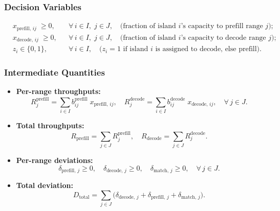 \subsubsection*{Decision Variables}
\[
\begin{aligned}
& x_{\mathrm{prefill},\,i j}\;\ge0,  &&\forall\,i\in I,\;j\in J,\quad\text{(fraction of island \(i\)'s capacity to prefill range \(j\))};\\
& x_{\mathrm{decode},\,i j}\;\ge0,  &&\forall\,i\in I,\;j\in J,\quad\text{(fraction of island \(i\)'s capacity to decode range \(j\))};\\
& z_i \in \{0,1\}, &&\forall\,i\in I,\quad\text{(\(z_i=1\) if island \(i\) is assigned to decode, else prefill).}
\end{aligned}
\]

\subsubsection*{Intermediate Quantities}
\begin{itemize}
  \item \textbf{Per-range throughputs:}
  \[
    R_{j}^{\mathrm{prefill}}
    = \sum_{i\in I} b^{\mathrm{prefill}}_{i j}\;x_{\mathrm{prefill},\,i j}, \quad
    R_{j}^{\mathrm{decode}}
    = \sum_{i\in I} b^{\mathrm{decode}}_{i j}\;x_{\mathrm{decode},\,i j},
    \quad \forall\,j\in J.
  \]

  \item \textbf{Total throughputs:}
  \[
    R_{\mathrm{prefill}}
    = \sum_{j\in J} R_{j}^{\mathrm{prefill}}, \quad
    R_{\mathrm{decode}}
    = \sum_{j\in J} R_{j}^{\mathrm{decode}}.
  \]

  \item \textbf{Per-range deviations:}
  \[
    \delta_{\mathrm{prefill},\,j} \ge 0,\quad
    \delta_{\mathrm{decode},\,j} \ge 0,\quad
    \delta_{\mathrm{match},\,j} \ge 0,
    \quad \forall\,j\in J.
  \]

  \item \textbf{Total deviation:}
  \[
    D_{\mathrm{total}}
    = \sum_{j\in J}\bigl(\delta_{\mathrm{decode},\,j} + \delta_{\mathrm{prefill},\,j} + \delta_{\mathrm{match},\,j}\bigr).
  \]
\end{itemize}

